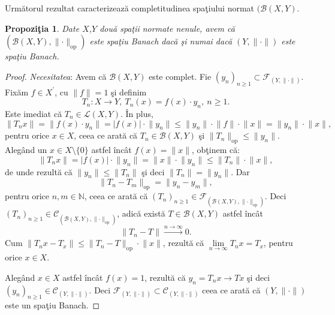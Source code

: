 \documentclass[ a4paper, 12pt]{report}
\newtheorem{prop}[theorem]{\bf Propozi\c tia }
\theoremstyle{definition}
\theoremstyle{remark}
\numberwithin{equation}{section}
\begin{document}
Urm\u atorul rezultat caracterizeaz\u a completitudinea spa\c tiului normat  $(\mathcal{B}(X,Y)$.

\begin{prop}
Date $X$,$Y$ dou\u a spa\c tii normate nenule, avem c\u a $(\mathcal{B}(X,Y), \lVert \cdot \rVert_{\mbox{op}}) $ este spa\c tiu Banach dac\u a \c si numai dac\u a $(Y, \lVert \cdot \rVert)$ este spa\c tiu Banach.
\end{prop}

\begin{proof}
{\it Necesitatea}: Avem c\u a $\mathcal{B}(X,Y)$ este complet. Fie $(y_n)_{n \geq 1} \subset \mathcal{F}_{(Y,\lVert \cdot \rVert)}.$
Fix\u am $f \in X^{'}$, cu $\lVert f \rVert = 1$ \c si definim
\[ T_n : X \rightarrow Y,\  T_n(x) = f(x) \cdot y_n,\  n \geq 1.\]
Este imediat c\u a $T_n \in \mathcal{L}(X,Y).$ \^In plus,
$$\lVert T_n x \rVert = \lVert f(x) \cdot y_n  \rVert = \lvert f(x) \rvert \cdot \lVert y_n \rVert \leq \lVert y_n \rVert \cdot \lVert f \rVert \cdot \lVert x \rVert = \lVert y_n  \rVert \cdot \lVert x \rVert,$$ pentru orice $x \in X$, ceea ce arat\u a c\u a $T_n \in \mathcal{B}(X,Y)$ \c si
 $\lVert T_n \rVert_{\mbox{op}} \leq \lVert y_n \rVert.
 $
Aleg\^and un $x \in X \setminus\{0\}$ astfel \^inc\^at $f(x) = \lVert x \rVert$, ob\c tinem c\u a:
$$\lVert T_n x \rVert = \lvert f(x) \rvert \cdot \lVert y_n \rVert = \lVert x \rVert \cdot \lVert y_n \rVert \leq \lVert T_n  \rVert \cdot \lVert x \rVert,$$ de unde rezult\u a c\u a
$\lVert y_n \rVert \leq \lVert T_n \rVert$ \c si deci $\lVert T_n \rVert = \lVert y_n \rVert$.
Dar
$$\lVert T_n -T_m  \rVert_{\mbox{op}} = \lVert y_n - y_m \rVert,$$ pentru orice $n, m \in \mathbb{N}$, ceea ce arat\u a c\u a $(T_n)_{n \geq 1} \in \mathcal{F}_{\left(\mathcal{B}(X,Y), \lVert \cdot  \rVert_{\mbox{op}}\right)}$. Deci $(T_n)_{n \geq 1} \in \mathcal{C}_{\left( \mathcal{B}(X,Y), \lVert \cdot  \rVert_{\mbox{op}} \right)}$, adic\u a exist\u a $T \in \mathcal{B}(X,Y) $ astfel \^inc\^at $$\lVert T_n - T  \rVert \stackrel{n \rightarrow \infty}{\longrightarrow} 0.$$
Cum $\lVert T_n x - T_x \rVert \leq \lVert T_n - T  \rVert_{\mbox{op}} \cdot \lVert x \rVert$, rezult\u a c\u a $\lim\limits_{n \to \infty} T_n x = T_x$, pentru orice $x \in X$.


Aleg\^and $x \in X$ astfel \^inc\^at $f(x) = 1$, rezult\u a c\u a $y_n = T_n x \longrightarrow Tx$ \c si deci $(y_n)_{n \geq 1} \in \mathcal{C}_{(Y,\lVert \cdot \rVert)}$. Deci $\mathcal{F}_{(Y,\lVert \cdot \rVert)} \subset \mathcal{C}_{(Y,\lVert \cdot \rVert)}$ ceea ce arat\u a c\u a $(Y,\lVert \cdot \rVert)$ este un spa\c tiu Banach.


\end{proof}
\end{document}
